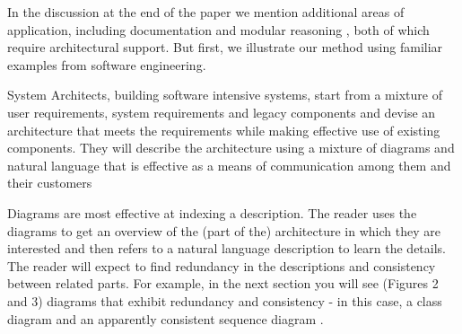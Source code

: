 \documentclass[times, 10pt,twocolumn]{article}
\begin{document}
In the discussion at the end of the paper we mention additional areas of application, including documentation \cite{Henderson3} and modular reasoning \cite{Rushby,Haley05arguingsecurity}, both of which require architectural support. But first, we illustrate our method using familiar examples from software engineering.

\noindent System Architects, building software intensive systems, start from a mixture of user requirements, system requirements and legacy components and devise an architecture that meets the requirements while making effective use of existing components. They will describe the architecture using a mixture of diagrams and natural language that is effective as a means of communication among them and their customers 

Diagrams are most effective at indexing a description. The reader uses the diagrams to get an overview of the (part of the) architecture in which they are interested and then refers to a natural language description to learn the details. The reader will expect to find redundancy in the descriptions and consistency between related parts. For example, in the next section you will see (Figures 2 and 3) diagrams that exhibit redundancy and consistency - in this case, a class diagram and an apparently consistent sequence diagram .
\end{document}
